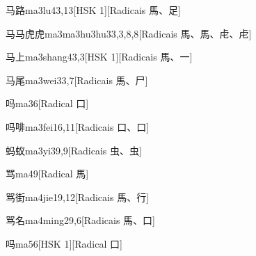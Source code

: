 \begin{entry}{马路}{ma3lu4}{3,13}[HSK 1][Radicais ⾺、⾜]
\end{entry}

\begin{entry}{马马虎虎}{ma3ma3hu3hu3}{3,3,8,8}[Radicais ⾺、⾺、⾌、⾌]
\end{entry}

\begin{entry}{马上}{ma3shang4}{3,3}[HSK 1][Radicais ⾺、⼀]
\end{entry}

\begin{entry}{马尾}{ma3wei3}{3,7}[Radicais ⾺、⼫]
\end{entry}

\begin{entry}{吗}{ma3}{6}[Radical ⼝]
\end{entry}

\begin{entry}{吗啡}{ma3fei1}{6,11}[Radicais ⼝、⼝]
\end{entry}

\begin{entry}{蚂蚁}{ma3yi3}{9,9}[Radicais ⾍、⾍]
\end{entry}

\begin{entry}{骂}{ma4}{9}[Radical ⾺]
\end{entry}

\begin{entry}{骂街}{ma4jie1}{9,12}[Radicais ⾺、⾏]
\end{entry}

\begin{entry}{骂名}{ma4ming2}{9,6}[Radicais ⾺、⼝]
\end{entry}

\begin{entry}{吗}{ma5}{6}[HSK 1][Radical ⼝]
\end{entry}

